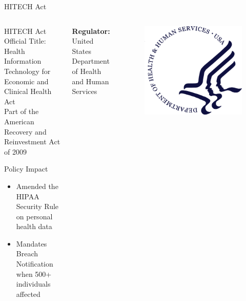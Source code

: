 \documentclass[10pt]{beamer}
\begin{document}
\begin{frame}{HITECH Act}
    \begin{columns}
          \begin{exampleblock}{HITECH Act}
            Official Title: Health Information Technology for Economic and Clinical Health Act \\
            Part of the American Recovery and Reinvestment Act of 2009
            \begin{center}Policy Impact\end{center}
            \begin{itemize}
            \item{Amended the HIPAA Security Rule on personal health data}
            \item{Mandates Breach Notification when 500+ individuals affected}
            \end{itemize}
          \end{exampleblock}
          
        \textbf{Regulator:} United States Department of Health and Human Services
        \begin{figure}
    	\includegraphics[width=\textwidth]{Figures/hhs_logo_large.png}
        \end{figure}
    \end{columns}
\end{frame}
\end{document}
